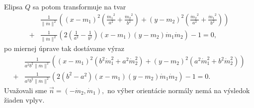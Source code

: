 %
Elipsa $Q$ sa potom transformuje na tvar
\begin{align} 
\label{eq:elipsa_v_novej_baze}
&\frac{1}{\|{\dot{m}}\|^2} \left( (x - m_1)^2 \left( \frac{{\dot{m}_1}^2}{a^2} + \frac{{\dot{m}_2}^2}{b^2} \right) + (y - m_2)^2 \left( \frac{{\dot{m}_2}^2}{a^2} + \frac{{\dot{m}_1}^2}{b^2} \right) \right) \\
+ &\frac{1}{\|{\dot{m}}\|^2} \left( 2\left( \frac{1}{a^2} - \frac{1}{b^2} \right)(x - m_1)(y - m_2)\dot{m}_1\dot{m}_2 \right) - 1 = 0,
\end{align}
po miernej úprave tak dostávame výraz
\begin{align*} 
&\frac{1}{a^2b^2\|\dot{m}\|^2} \left( (x - m_1)^2 \left( b^2 \dot{m}_1^2 + a^2 \dot{m}_2^2 \right) + (y - m_2)^2 \left( a^2 \dot{m}_1^2 + b^2 \dot{m}_2^2 \right) \right) \\
+ &\frac{1}{a^2b^2\|\dot{m}\|^2} \left( 2(b^2 - a^2)(x - m_1)(y - m_2)\dot{m}_1\dot{m}_2 \right) - 1 = 0.
\end{align*}
Uvažovali sme $\vec{n}=(-\dot{m}_2, \dot{m}_1), $ no výber orientácie normály nemá na výsledok žiaden vplyv.

